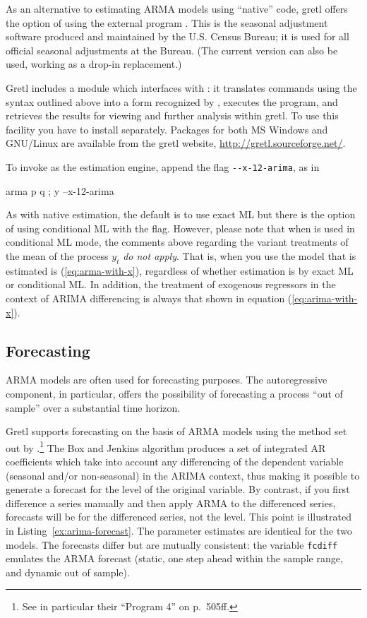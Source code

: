 As an alternative to estimating ARMA models using ``native'' code,
gretl offers the option of using the external program
.  This is the seasonal adjustment software produced
and maintained by the U.S. Census Bureau; it is used for all official
seasonal adjustments at the Bureau. (The current version  
can also be used, working as a drop-in replacement.) 

Gretl includes a module which interfaces with :
it translates  commands using the syntax outlined above into
a form recognized by , executes the program, and
retrieves the results for viewing and further analysis within
gretl.  To use this facility you have to install
 separately.  Packages for both MS Windows and
GNU/Linux are available from the gretl website,
\url{http://gretl.sourceforge.net/}.

To invoke  as the estimation engine, append the flag
\verb|--x-12-arima|, as in
\begin{code}
arma p q ; y --x-12-arima
\end{code}
As with native estimation, the default is to use exact ML but there is
the option of using conditional ML with the  flag.
However, please note that when  is used in conditional
ML mode, the comments above regarding the variant treatments of the
mean of the process $y_t$ \textit{do not apply}.  That is, when you
use  the model that is estimated is
(\ref{eq:arma-with-x}), regardless of whether estimation is by exact
ML or conditional ML.  In addition, the treatment of exogenous
regressors in the context of ARIMA differencing is always that shown
in equation (\ref{eq:arima-with-x}).


\subsection{Forecasting}
\label{arma-fcast}

ARMA models are often used for forecasting purposes.  The
autoregressive component, in particular, offers the possibility of
forecasting a process ``out of sample'' over a substantial time
horizon.

Gretl supports forecasting on the basis of ARMA models using the
method set out by \cite{box-jenkins76}.\footnote{See in particular
  their ``Program 4'' on p.\ 505ff.}  The Box and Jenkins algorithm
produces a set of integrated AR coefficients which take into account
any differencing of the dependent variable (seasonal and/or
non-seasonal) in the ARIMA context, thus making it possible to
generate a forecast for the level of the original variable.  By
contrast, if you first difference a series manually and then apply
ARMA to the differenced series, forecasts will be for the differenced
series, not the level.  This point is illustrated
in Listing~\ref{ex:arima-forecast}.  The parameter estimates are identical
for the two models.  The forecasts differ but are mutually consistent:
the variable \texttt{fcdiff} emulates the ARMA forecast (static,
one step ahead within the sample range, and dynamic out of sample).

